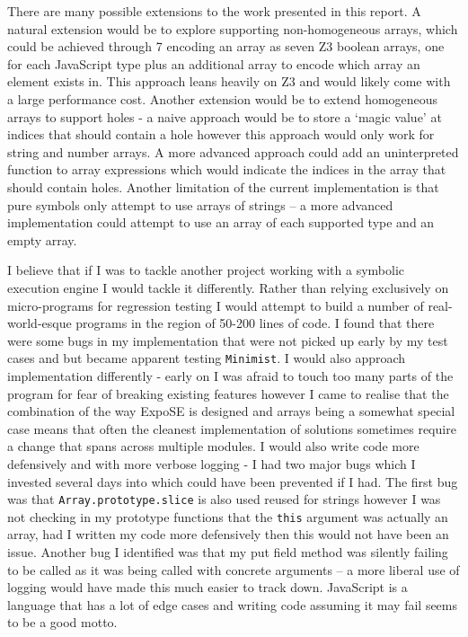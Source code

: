 \documentclass[]{final_report}
\begin{document}
There are many possible extensions to the work presented in this report. A natural extension would be to explore supporting non-homogeneous arrays, which could be achieved through 7 encoding an array as seven Z3 boolean arrays, one for each JavaScript type plus an additional array to encode which array an element exists in. This approach leans heavily on Z3 and would likely come with a large performance cost. Another extension would be to extend homogeneous arrays to support holes - a naive approach would be to store a `magic value' at indices that should contain a hole however this approach would only work for string and number arrays. A more advanced approach could add an uninterpreted function to array expressions which would indicate the indices in the array that should contain holes. Another limitation of the current implementation is that pure symbols only attempt to use arrays of strings -- a more advanced implementation could attempt to use an array of each supported type and an empty array.

I believe that if I was to tackle another project working with a symbolic execution engine I would tackle it differently. Rather than relying exclusively on micro-programs for regression testing I would attempt to build a number of real-world-esque programs in the region of 50-200 lines of code. I found that there were some bugs in my implementation that were not picked up early by my test cases and but became apparent testing \lstinline|Minimist|. I would also approach implementation differently - early on I was afraid to touch too many parts of the program for fear of breaking existing features however I came to realise that the combination of the way  ExpoSE is designed and arrays being a somewhat special case means that often the cleanest implementation of solutions sometimes require a change that spans across multiple modules. I would also write code more defensively and with more verbose logging - I had two major bugs which I invested several days into which could have been prevented if I had. The first bug was that \lstinline|Array.prototype.slice| is also used reused for strings however I was not checking in my prototype functions that the \lstinline|this| argument was actually an array, had I written my code more defensively then this would not have been an issue. Another bug I identified was that my put field method was silently failing to be called as it was being called with concrete arguments -- a more liberal use of logging would have made this much easier to track down. JavaScript is a language that has a lot of edge cases and  writing code assuming it may fail seems to be a good motto.
\end{document}
